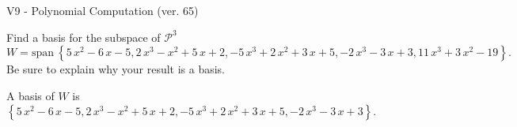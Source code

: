 \begin{exercise}
  \begin{exerciseTitle}V9 - Polynomial Computation (ver. 65)\end{exerciseTitle}
  \begin{exerciseStatement}
    Find a basis for the subspace of \(\mathcal{P}^3\) 
\[W=\mathrm{span}\ \left\{5 \, x^{2} - 6 \, x - 5 , 2 \, x^{3} - x^{2} + 5 \, x + 2 , -5 \, x^{3} + 2 \, x^{2} + 3 \, x + 5 , -2 \, x^{3} - 3 \, x + 3 , 11 \, x^{3} + 3 \, x^{2} - 19\right\}.\]
 Be sure to explain why your result is a basis.


  \end{exerciseStatement}
  \begin{exerciseAnswer}
   A basis of \(W\) is  \(\left\{5 \, x^{2} - 6 \, x - 5 , 2 \, x^{3} - x^{2} + 5 \, x + 2 , -5 \, x^{3} + 2 \, x^{2} + 3 \, x + 5 , -2 \, x^{3} - 3 \, x + 3\right\}\).
  


  \end{exerciseAnswer}
\end{exercise}